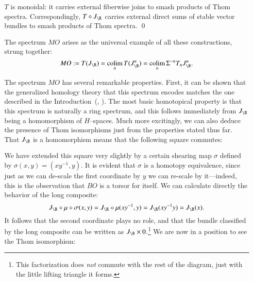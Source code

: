 \begin{lemma}\label{ThomSpacesAreMonoidal}
$T$ is monoidal: it carries external fiberwise joins to smash products of Thom spectra.  Correspondingly, $T \circ J_{\R}$ carries external direct sums of stable vector bundles to smash products of Thom spectra. \qed
\end{lemma}

\begin{definition}\label{DefnOfMO}
The spectrum $MO$ arises as the universal example of all these constructions, strung together:
\[MO := T(J_{\R}) = \colim_n T(J_{\R}^n) = \colim_n \Susp^{-n} T_n J_{\R}^n.\]
\end{definition}

The spectrum $MO$ has several remarkable properties.  First, it can be shown that the generalized homology theory that this spectrum encodes matches the one described in the Introduction~(\cite[Theorem 12.30]{Switzer}, \cite[Theorem 7.27]{Rudyak}).  The most basic homotopical property is that this spectrum is naturally a ring spectrum, and this follows immediately from $J_{\R}$ being a homomorphism of $H$--spaces.  Much more excitingly, we can also deduce the presence of Thom isomorphisms just from the properties stated thus far.  That $J_{\R}$ is a homomorphism means that the following square commutes:
\begin{center}
\end{center}
We have extended this square very slightly by a certain shearing map $\sigma$ defined by $\sigma(x, y) = (xy^{-1}, y)$.  It is evident that $\sigma$ is a homotopy equivalence, since just as we can de-scale the first coordinate by $y$ we can re-scale by it---indeed, this is the observation that $BO$ is a torsor for itself.  We can calculate directly the behavior of the long composite: \[J_{\R} \circ \mu \circ \sigma(x, y) = J_{\R} \circ \mu(xy^{-1}, y) = J_{\R}(xy^{-1}y) = J_{\R}(x).\]  It follows that the second coordinate plays no role, and that the bundle classified by the long composite can be written as $J_{\R} \times 0$.\footnote{This factorization does \emph{not} commute with the rest of the diagram, just with the little lifting triangle it forms.}  We are now in a position to see the Thom isomorphism:
